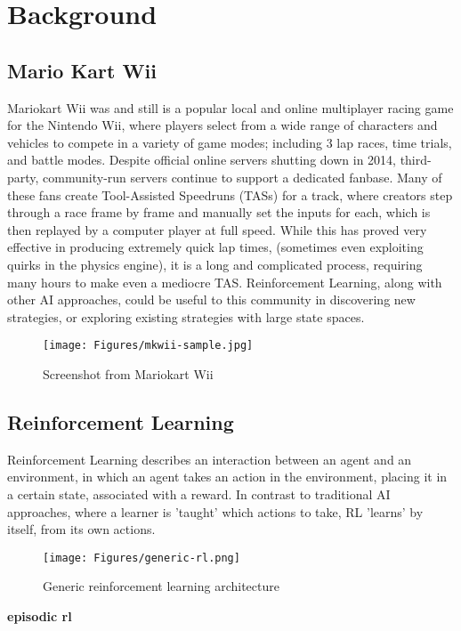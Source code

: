 
\chapter{Background}
\section{Mario Kart Wii}
Mariokart Wii was and still is a popular local and online multiplayer racing game for the Nintendo Wii, where players select from a wide range of characters and vehicles to compete in a variety of game modes; including 3 lap races, time trials, and battle modes. Despite official online servers shutting down in 2014, third-party, community-run servers continue to support a dedicated fanbase. Many of these fans create Tool-Assisted Speedruns (TASs) for a track, where creators step through a race frame by frame and manually set the inputs for each, which is then replayed by a computer player at full speed. While this has proved very effective in producing extremely quick lap times, (sometimes even exploiting quirks in the physics engine), it is a long and complicated process, requiring many hours to make even a mediocre TAS. Reinforcement Learning, along with other AI approaches, could be useful to this community in discovering new strategies, or exploring existing strategies with large state spaces.
\begin{figure}
    \centering
    \texttt{[image: Figures/mkwii-sample.jpg]}
    \caption{Screenshot from Mariokart Wii}
    \label{fig:mariokart-standard}
\end{figure}
\section{Reinforcement Learning}
Reinforcement Learning describes an interaction between an agent and an environment, in which an agent takes an action in the environment, placing it in a certain state, associated with a reward. In contrast to traditional AI approaches, where a learner is 'taught' which actions to take, RL 'learns' by itself, from its own actions.
\begin{figure}[htb]
    \centering
    \texttt{[image: Figures/generic-rl.png]}
    \caption{Generic reinforcement learning architecture\cite{sutton2018reinforcement}} %
    \label{fig:q-learning-generic}
\end{figure}
\textbf{episodic rl}
